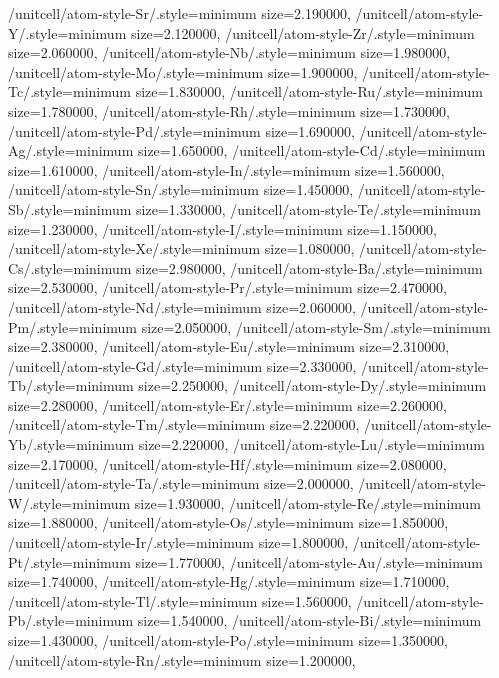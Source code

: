 {    /unitcell/atom-style-Sr/.style={minimum size=2.190000\@atom@scale},
    /unitcell/atom-style-Y/.style={minimum size=2.120000\@atom@scale},
    /unitcell/atom-style-Zr/.style={minimum size=2.060000\@atom@scale},
    /unitcell/atom-style-Nb/.style={minimum size=1.980000\@atom@scale},
    /unitcell/atom-style-Mo/.style={minimum size=1.900000\@atom@scale},
    /unitcell/atom-style-Tc/.style={minimum size=1.830000\@atom@scale},
    /unitcell/atom-style-Ru/.style={minimum size=1.780000\@atom@scale},
    /unitcell/atom-style-Rh/.style={minimum size=1.730000\@atom@scale},
    /unitcell/atom-style-Pd/.style={minimum size=1.690000\@atom@scale},
    /unitcell/atom-style-Ag/.style={minimum size=1.650000\@atom@scale},
    /unitcell/atom-style-Cd/.style={minimum size=1.610000\@atom@scale},
    /unitcell/atom-style-In/.style={minimum size=1.560000\@atom@scale},
    /unitcell/atom-style-Sn/.style={minimum size=1.450000\@atom@scale},
    /unitcell/atom-style-Sb/.style={minimum size=1.330000\@atom@scale},
    /unitcell/atom-style-Te/.style={minimum size=1.230000\@atom@scale},
    /unitcell/atom-style-I/.style={minimum size=1.150000\@atom@scale},
    /unitcell/atom-style-Xe/.style={minimum size=1.080000\@atom@scale},
    /unitcell/atom-style-Cs/.style={minimum size=2.980000\@atom@scale},
    /unitcell/atom-style-Ba/.style={minimum size=2.530000\@atom@scale},
    /unitcell/atom-style-Pr/.style={minimum size=2.470000\@atom@scale},
    /unitcell/atom-style-Nd/.style={minimum size=2.060000\@atom@scale},
    /unitcell/atom-style-Pm/.style={minimum size=2.050000\@atom@scale},
    /unitcell/atom-style-Sm/.style={minimum size=2.380000\@atom@scale},
    /unitcell/atom-style-Eu/.style={minimum size=2.310000\@atom@scale},
    /unitcell/atom-style-Gd/.style={minimum size=2.330000\@atom@scale},
    /unitcell/atom-style-Tb/.style={minimum size=2.250000\@atom@scale},
    /unitcell/atom-style-Dy/.style={minimum size=2.280000\@atom@scale},
    /unitcell/atom-style-Er/.style={minimum size=2.260000\@atom@scale},
    /unitcell/atom-style-Tm/.style={minimum size=2.220000\@atom@scale},
    /unitcell/atom-style-Yb/.style={minimum size=2.220000\@atom@scale},
    /unitcell/atom-style-Lu/.style={minimum size=2.170000\@atom@scale},
    /unitcell/atom-style-Hf/.style={minimum size=2.080000\@atom@scale},
    /unitcell/atom-style-Ta/.style={minimum size=2.000000\@atom@scale},
    /unitcell/atom-style-W/.style={minimum size=1.930000\@atom@scale},
    /unitcell/atom-style-Re/.style={minimum size=1.880000\@atom@scale},
    /unitcell/atom-style-Os/.style={minimum size=1.850000\@atom@scale},
    /unitcell/atom-style-Ir/.style={minimum size=1.800000\@atom@scale},
    /unitcell/atom-style-Pt/.style={minimum size=1.770000\@atom@scale},
    /unitcell/atom-style-Au/.style={minimum size=1.740000\@atom@scale},
    /unitcell/atom-style-Hg/.style={minimum size=1.710000\@atom@scale},
    /unitcell/atom-style-Tl/.style={minimum size=1.560000\@atom@scale},
    /unitcell/atom-style-Pb/.style={minimum size=1.540000\@atom@scale},
    /unitcell/atom-style-Bi/.style={minimum size=1.430000\@atom@scale},
    /unitcell/atom-style-Po/.style={minimum size=1.350000\@atom@scale},
    /unitcell/atom-style-Rn/.style={minimum size=1.200000\@atom@scale},
}
